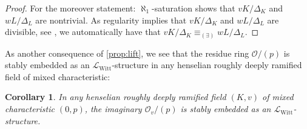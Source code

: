 \documentclass[a4paper]{amsart}
\theoremstyle{mystyle2}
\newtheorem{kor}[thm]{Corollary}
\theoremstyle{mystyle}
\renewcommand{\L}{\mathcal{L}}
\newcommand{\LWitt}{\L_{\mathrm{Witt}}}
\renewcommand{\O}{\mathcal{O}}
\numberwithin{equation}{section}
\begin{document}
\begin{proof}
        For the moreover statement: $\aleph_1$-saturation shows that $vK/\Delta_K$ and $wL/\Delta_L$ are nontrivial.
        As regularity implies that $vK/\Delta_K$ and $wL/\Delta_L$ are divisible, see
        \cite[\S 3]{Rob}, we automatically have that $vK/\Delta_K \equiv_{(\exists)} wL / \Delta_L$.
    \end{proof}

    As another consequence of \cref{prop:lift}, we see that the residue ring $\O/(p)$ is stably embedded as an
    $\LWitt$-structure in any henselian roughly deeply ramified field of mixed 
    characteristic:
    \begin{kor} \label{kor:SE}
    In any henselian roughly deeply ramified field $(K,v)$ of mixed characteristic $(0,p)$, the imaginary
    $\mathcal{O}_v/(p)$ is stably embedded as an $\LWitt$-structure.
    \end{kor}
\end{document}
